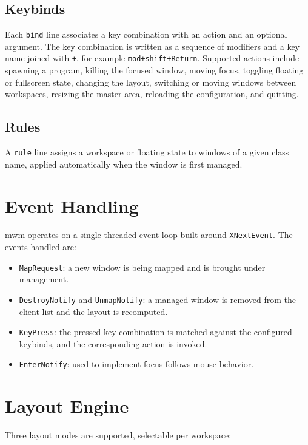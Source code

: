\documentclass[11pt,a4paper]{article}
\begin{document}
\subsection{Keybinds}

Each \texttt{bind} line associates a key combination with an action and
an optional argument. The key combination is written as a sequence of
modifiers and a key name joined with \texttt{+}, for example
\texttt{mod+shift+Return}. Supported actions include spawning a program,
killing the focused window, moving focus, toggling floating or fullscreen
state, changing the layout, switching or moving windows between
workspaces, resizing the master area, reloading the configuration, and
quitting.

\subsection{Rules}

A \texttt{rule} line assigns a workspace or floating state to windows of
a given class name, applied automatically when the window is first
managed.

\section{Event Handling}

mwm operates on a single-threaded event loop built around
\texttt{XNextEvent}. The events handled are:

\begin{itemize}
  \item \texttt{MapRequest}: a new window is being mapped and is brought
        under management.
  \item \texttt{DestroyNotify} and \texttt{UnmapNotify}: a managed window
        is removed from the client list and the layout is recomputed.
  \item \texttt{KeyPress}: the pressed key combination is matched against
        the configured keybinds, and the corresponding action is invoked.
  \item \texttt{EnterNotify}: used to implement focus-follows-mouse
        behavior.
\end{itemize}

\section{Layout Engine}

Three layout modes are supported, selectable per workspace:
\end{document}
